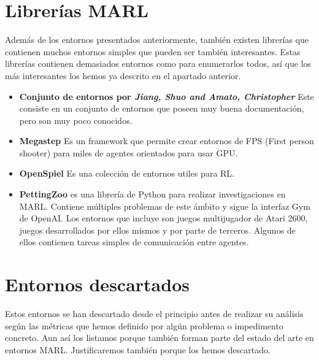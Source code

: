 \section{Librerías MARL}
Además de los entornos presentados anteriormente, también existen librerías que contienen muchos entornos simples que pueden ser también interesantes. Estas librerías contienen demasiados entornos como para enumerarlos todos, así que los más interesantes los hemos ya descrito en el apartado anterior.

\begin{itemize}
	\item \textbf{Conjunto de entornos por \textit{Jiang, Shuo and Amato, Christopher}} \cite {jiang-repo} Este consiste en un conjunto de entornos que poseen muy buena documentación, pero son muy poco conocidos.

	\item \textbf{Megastep} \cite {megastep-repo} Es un framework que permite crear entornos de FPS (First person shooter) para miles de agentes orientados para usar GPU.

	\item \textbf{OpenSpiel} \cite {openspiel-repo} Es una colección de entornos utiles para RL.

	\item \textbf{PettingZoo} \cite {petting-repo} es una librería de Python para realizar investigaciones en MARL. Contiene múltiples problemas de este ámbito y sigue la interfaz Gym de OpenAI. Los entornos que incluye son juegos multijugador de Atari 2600, juegos desarrollados por ellos mismos y por parte de terceros. Algunos de ellos contienen tareas simples de comunicación entre agentes.\cite {env-list}


\end{itemize}

\section{Entornos descartados}
Estos entornos se han descartado desde el principio antes de realizar su análisis según las métricas que hemos definido por algún problema o impedimento concreto. Aun así los listamos porque también forman parte del estado del arte en entornos MARL. Justificaremos también porque los hemos descartado.

